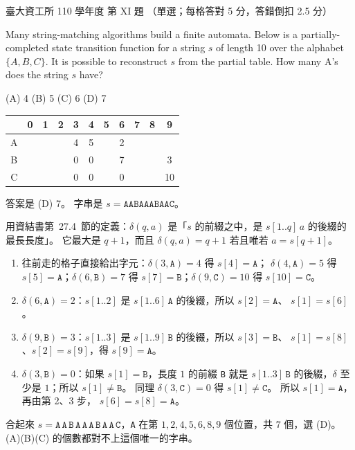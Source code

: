 \begin{pastexam}[label={px:ntu-110-dsaa-11}]{臺大資工所 110 學年度 第 XI 題}
（單選；每格答對 5 分，答錯倒扣 2.5 分）

Many string-matching algorithms build a finite automata. Below is a partially-completed state
transition function for a string $s$ of length 10 over the alphabet $\{A,B,C\}$. It is possible
to reconstruct $s$ from the partial table. How many A's does the string $s$ have?
\underline{}

(A) 4 \qquad (B) 5 \qquad (C) 6 \qquad (D) 7
\begin{center}
\begin{tabular}{c|cccccccccc}
 & 0 & 1 & 2 & 3 & 4 & 5 & 6 & 7 & 8 & 9 \\ \hline
A & & & & 4 & 5 & & 2 & & & \\
B & & & & 0 & 0 & & 7 & & & 3 \\
C & & & & 0 & 0 & & 0 & & & 10 \\
\end{tabular}
\end{center}
\end{pastexam}

\begin{pastsoln}
答案是 (D) 7。 字串是 $s = \mathtt{AABAAABAAC}$。

用資結書第~27.4~節的定義：$\delta(q, a)$ 是「$s$ 的前綴之中，是 $s[1..q]\,a$ 的後綴的最長長度」。
它最大是 $q + 1$，而且 $\delta(q, a) = q + 1$ 若且唯若 $a = s[q + 1]$。

\begin{enumerate}
\item 往前走的格子直接給出字元：$\delta(3, \mathtt{A}) = 4$ 得 $s[4] = \mathtt{A}$；
$\delta(4, \mathtt{A}) = 5$ 得 $s[5] = \mathtt{A}$；$\delta(6, \mathtt{B}) = 7$ 得
$s[7] = \mathtt{B}$；$\delta(9, \mathtt{C}) = 10$ 得 $s[10] = \mathtt{C}$。
\item $\delta(6, \mathtt{A}) = 2$：$s[1..2]$ 是 $s[1..6]\,\mathtt{A}$ 的後綴，所以 $s[2] = \mathtt{A}$、
$s[1] = s[6]$。
\item $\delta(9, \mathtt{B}) = 3$：$s[1..3]$ 是 $s[1..9]\,\mathtt{B}$ 的後綴，所以 $s[3] = \mathtt{B}$、
$s[1] = s[8]$、$s[2] = s[9]$，得 $s[9] = \mathtt{A}$。
\item $\delta(3, \mathtt{B}) = 0$：如果 $s[1] = \mathtt{B}$，長度 $1$ 的前綴 \texttt{B} 就是
$s[1..3]\,\mathtt{B}$ 的後綴，$\delta$ 至少是 $1$；所以 $s[1] \ne \mathtt{B}$。 同理
$\delta(3, \mathtt{C}) = 0$ 得 $s[1] \ne \mathtt{C}$。 所以 $s[1] = \mathtt{A}$，再由第 2、3 步，
$s[6] = s[8] = \mathtt{A}$。
\end{enumerate}

合起來 $s = \mathtt{A\,A\,B\,A\,A\,A\,B\,A\,A\,C}$，\texttt{A} 在第 $1, 2, 4, 5, 6, 8, 9$ 個位置，共
$7$ 個，選 (D)。 (A)(B)(C) 的個數都對不上這個唯一的字串。

\end{pastsoln}
